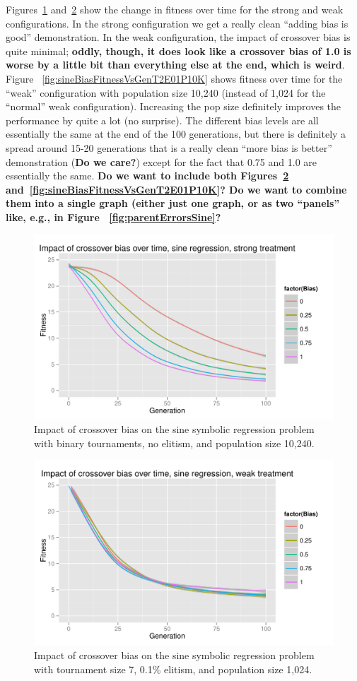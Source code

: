 \documentclass{sig-alternate}
\begin{document}
Figures~\ref{fig:sineBiasFitnessVsGenStrong} and~\ref{fig:sineBiasFitnessVsGenWeak} show the change in fitness 
over time for the strong and weak configurations. In the strong configuration we get a really clean ``adding bias is 
good'' demonstration. In the weak configuration, the impact of crossover bias is quite minimal; \textbf{oddly, though, it 
does look like a crossover bias of 1.0 is worse by a little bit than everything else at the end, which is weird}. Figure~
\ref{fig:sineBiasFitnessVsGenT2E01P10K} shows fitness over time for the ``weak'' configuration with population size 
10,240 (instead of 1,024 for the ``normal'' weak configuration). Increasing the pop size definitely improves the 
performance by quite a lot (no surprise). The different bias levels are all essentially the same at the end of the 100 
generations, but there is definitely a spread around 15-20 generations that is a really clean ``more bias is better'' 
demonstration (\textbf{Do we care?}) except for the fact that 0.75 and 1.0 are essentially the same. \textbf{Do we 
want to include both Figures~\ref{fig:sineBiasFitnessVsGenWeak} and~\ref{fig:sineBiasFitnessVsGenT2E01P10K}? 
Do we want to combine them into a single graph (either just one graph, or as two ``panels'' like, e.g., in Figure~
\ref{fig:parentErrorsSine}?}

\begin{figure}
\centering
\includegraphics[width=0.45 \textwidth]{Plots/Sine_XO_fitness_vs_gen_strong.pdf}
\caption{Impact of crossover bias on the sine symbolic regression problem with binary tournaments, no elitism, and 
population size 10,240.}
\label{fig:sineBiasFitnessVsGenStrong}
\end{figure}

\begin{figure}
\centering
\includegraphics[width=0.45 \textwidth]{Plots/Sine_XO_fitness_vs_gen_weak.pdf}
\caption{Impact of crossover bias on the sine symbolic regression problem with tournament size 7, 0.1\% elitism, and 
population size 1,024.}
\label{fig:sineBiasFitnessVsGenWeak}
\end{figure}
\end{document}
